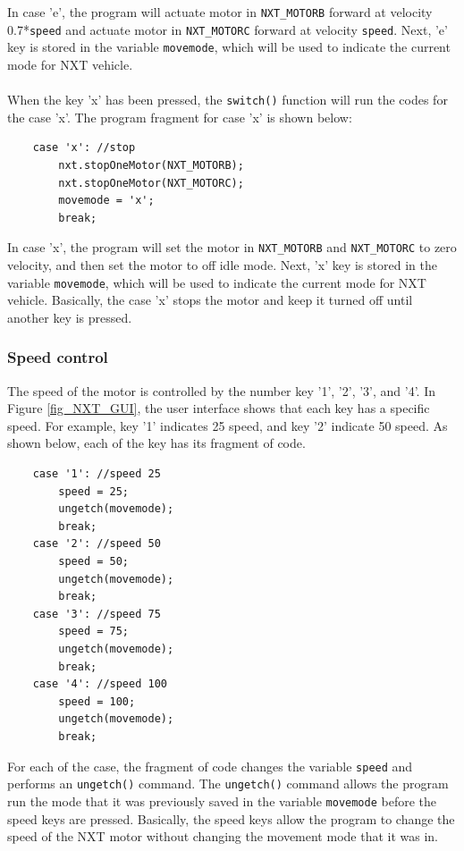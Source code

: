 In case 'e', the program will actuate motor in \verb+NXT_MOTORB+ forward at velocity 
0.7*\verb+speed+ and actuate motor in \verb+NXT_MOTORC+ forward at velocity \verb+speed+. Next, 'e'
key is stored in the variable \verb+movemode+, which will be used to indicate the current mode for 
NXT vehicle.
\\ \\
\noindent
When the key 'x' has been pressed, the \verb+switch()+ function will run the codes for the case 'x'.
The program fragment for case 'x' is shown below:
\begin{verbatim} 
    case 'x': //stop
        nxt.stopOneMotor(NXT_MOTORB);
        nxt.stopOneMotor(NXT_MOTORC);
        movemode = 'x';
        break;
\end{verbatim}
In case 'x', the program will set the motor in \verb+NXT_MOTORB+ and \verb+NXT_MOTORC+ to zero 
velocity, and then set the motor to off idle mode. Next, 'x' key is stored in the variable 
\verb+movemode+, which will be used to indicate the current mode for NXT vehicle.
Basically, the case 'x' stops the motor and keep it turned off until another key is pressed.

\subsubsection*{Speed control}
The speed of the motor is controlled by the number key '1', '2', '3', and '4'.
In Figure \ref{fig_NXT_GUI}, the user interface shows that each key has a specific speed.
For example, key '1' indicates 25 speed, and key '2' indicate 50 speed.
As shown below, each of the key has its fragment of code.

\begin{verbatim}
    case '1': //speed 25
        speed = 25;
        ungetch(movemode);
        break;
    case '2': //speed 50
        speed = 50;
        ungetch(movemode);
        break;
    case '3': //speed 75
        speed = 75;
        ungetch(movemode);
        break;
    case '4': //speed 100
        speed = 100;
        ungetch(movemode);
        break;
\end{verbatim}
\noindent
For each of the case, the fragment of code changes the variable \verb+speed+ and performs an \verb+ungetch()+ command.
The \verb+ungetch()+ command allows the program run the mode that it was previously saved in the variable \verb+movemode+
before the speed keys are pressed. Basically, the speed keys allow the program to change the speed of the NXT motor without 
changing the movement mode that it was in.

